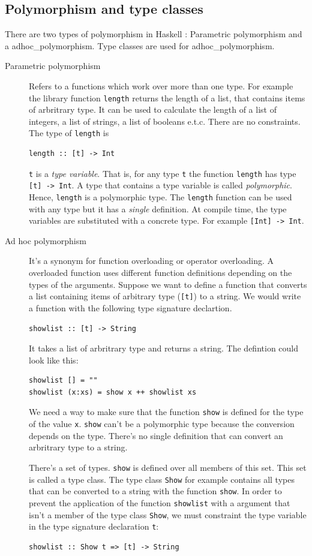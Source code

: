 \subsection{Polymorphism and type classes}
\label{sec:polymorphism}
There are two types of polymorphism in Haskell \cite{Cardelli}: Parametric polymorphism and a \gls{adhoc_polymorphism}. Type classes are used for \gls{adhoc_polymorphism}.
\begin{description}
\item[Parametric polymorphism] Refers to a functions which work over more than one type. For example the library function \verb|length| returns the length of a list, that contains items of arbritrary type. It can be used to calculate the length of a list of integers, a list of strings, a list of booleans e.t.c. There are no constraints. The type of \verb|length| is
\begin{verbatim}
length :: [t] -> Int
\end{verbatim}
\verb|t| is a \emph{type variable}. That is, for any type \verb|t| the function \verb|length| has type \verb|[t] -> Int|. A type that contains a type variable is called \emph{polymorphic}. Hence, \verb|length| is a polymorphic type.
The \verb|length| function can be used with any type but it has a \emph{single} definition.  At compile time, the type variables are substituted with a concrete type. For example
\verb|[Int] -> Int|. 
\item[Ad hoc polymorphism] It's a synonym for function overloading or operator overloading. A overloaded function uses different function definitions depending on the types of the arguments. Suppose we want to define a function that converts a list containing items of arbitrary type (\verb|[t]|) to a string. We would write a function with the following type signature declartion.
\begin{verbatim}
showlist :: [t] -> String
\end{verbatim}
It takes a list of arbritrary type and returns a string. The defintion could look like this:
\begin{verbatim}
showlist [] = ""
showlist (x:xs) = show x ++ showlist xs
\end{verbatim}
We need a way to make sure that the function \verb|show| is defined for the type of the value \verb|x|. \verb|show| can't be a polymorphic type because the conversion depends on the type. There's no single definition that can convert an arbritrary type to a string. 

There's a set of types. \verb|show| is defined over all members of this set. This set is called a type class. The type class \verb|Show| for example contains all types that can be converted to a string with the function \verb|show|. In order to prevent the application of the function \verb|showlist| with a argument that isn't a member of the type class \verb|Show|, we must constraint the type variable in the type signature declaration \verb|t|:
\begin{verbatim}
showlist :: Show t => [t] -> String
\end{verbatim}
\end{description}

